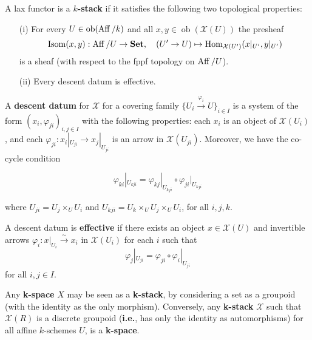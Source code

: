 \documentclass[12pt]{article}
\begin{document}
\begin{definition}
    A lax functor is a \textbf{$k$-stack} if it satisfies the following two topological properties:

    \begin{enumerate}
        \item[(i)] For every $U \in \operatorname{ob}(\operatorname{Aff}/k)$ and all $x, y \in \operatorname{ob}(\mathcal{X}(U))$ the presheaf
              \[
                  \operatorname{Isom}(x,y) : \operatorname{Aff}/U \to \mathbf{Set}, \quad (U' \to U) \mapsto \operatorname{Hom}_{\mathcal{X}(U')}(x|_{U'}, y|_{U'})
              \]
              is a sheaf (with respect to the fppf topology on $\operatorname{Aff}/U$).
        \item[(ii)] Every descent datum is effective.
    \end{enumerate}
\end{definition}

\begin{definition}
    A \textbf{descent datum} for $\mathcal{X}$ for a covering family $\{ U_i \xrightarrow{\varphi_i} U \}_{i \in I}$ is a system of the form
    $(x_i, \varphi_{ji})_{i,j \in I}$ with the following properties: each $x_i$ is an object of $\mathcal{X}(U_i)$, and each
    $\varphi_{ji} : x_i|_{U_{ji}} \to x_j|_{U_{ji}}$ is an arrow in $\mathcal{X}(U_{ji})$. Moreover, we have the co-cycle condition

    \[
        \varphi_{ki}|_{U_{kji}} = \varphi_{kj}|_{U_{kji}} \circ \varphi_{ji}|_{U_{kji}}
    \]

    where $U_{ji} = U_j \times_U U_i$ and $U_{kji} = U_k \times_U U_j \times_U U_i$, for all $i,j,k$.

    A descent datum is \textbf{effective} if there exists an object $x \in \mathcal{X}(U)$ and invertible arrows
    $\varphi_i : x|_{U_i} \xrightarrow{\sim} x_i$ in $\mathcal{X}(U_i)$ for each $i$ such that
    \[
        \varphi_j|_{U_{ji}} = \varphi_{ji} \circ \varphi_i|_{U_{ji}}
    \]
    for all $i,j \in I$.
\end{definition}


Any \textbf{k-space} $X$ may be seen as a \textbf{k-stack}, by considering a set as a groupoid (with the identity as the only morphism).
Conversely, any \textbf{k-stack} $\mathcal{X}$ such that $\mathcal{X}(R)$ is a discrete groupoid (\textbf{i.e.}, has only the identity as automorphisms)
for all affine $k$-schemes $U$, is a \textbf{k-space}.
\end{document}
